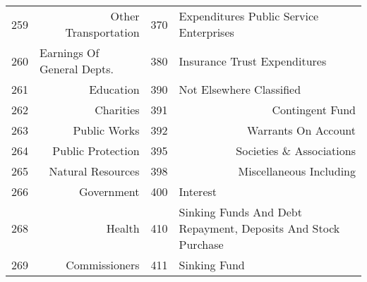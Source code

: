 \begin{tabular}{@{}rr|r|r|@{}}
\multicolumn{1}{|r|}{259}           & Other Transportation                                               & \multicolumn{1}{l|}{370}           & \multicolumn{1}{l|}{Expenditures Public Service Enterprises}                       \\
\multicolumn{1}{|l|}{260}           & \multicolumn{1}{l|}{Earnings Of General Depts.}                    & \multicolumn{1}{l|}{380}           & \multicolumn{1}{l|}{Insurance Trust Expenditures}                                  \\
\multicolumn{1}{|r|}{261}           & Education                                                          & \multicolumn{1}{l|}{390}           & \multicolumn{1}{l|}{Not Elsewhere Classified}                                      \\
\multicolumn{1}{|r|}{262}           & Charities                                                          & 391                                & Contingent Fund                                                                    \\
\multicolumn{1}{|r|}{263}           & Public Works                                                       & 392                                & Warrants On Account                                                                \\
\multicolumn{1}{|r|}{264}           & Public Protection                                                  & 395                                & Societies \& Associations                                                          \\
\multicolumn{1}{|r|}{265}           & Natural Resources                                                  & 398                                & Miscellaneous Including                                                            \\
\multicolumn{1}{|r|}{266}           & Government                                                         & \multicolumn{1}{l|}{400}           & \multicolumn{1}{l|}{Interest}                                                      \\
\multicolumn{1}{|r|}{268}           & Health                                                             & \multicolumn{1}{l|}{410}           & \multicolumn{1}{l|}{Sinking Funds And Debt Repayment, Deposits And Stock Purchase} \\
\multicolumn{1}{|r|}{269}           & Commissioners                                                      & \multicolumn{1}{l|}{411}           & \multicolumn{1}{l|}{Sinking Fund}                                                  \\

\end{tabular}
